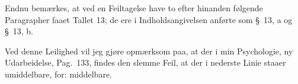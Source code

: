 \documentclass[12pt,a4paper]{book}
\begin{document}
\medskip
\noindent
Endnu bemærkes, at ved en Feiltagelse have to efter hinanden følgende Paragrapher
faaet Tallet 13; de ere i Indholdsangivelsen anførte som \S~13, a og \S~13, b.

\smallskip
\noindent
Ved denne Leilighed vil jeg gjøre opmærksom paa, at der i min Psychologie, ny
Udarbeidelse, Pag.\ 133, findes den slemme Feil, at der i nederste Linie staaer
umiddelbare, for: middelbare.
\end{document}
